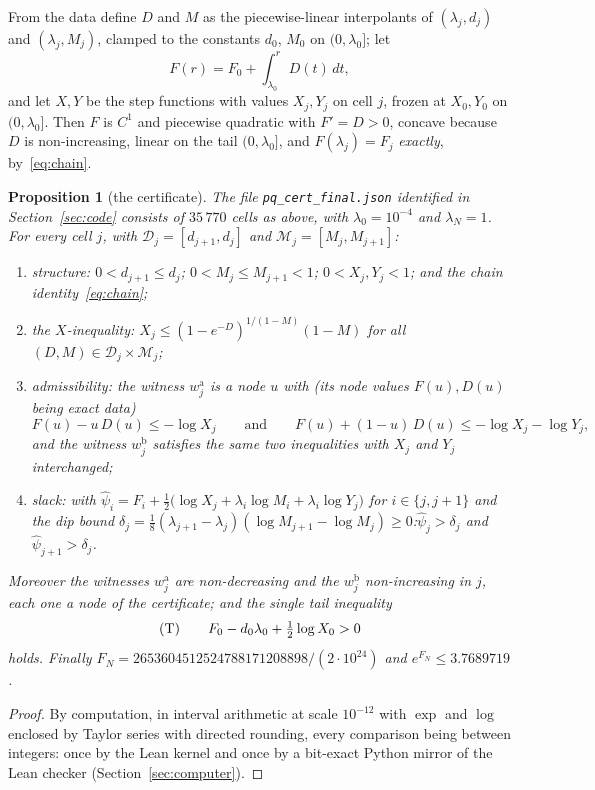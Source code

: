 \documentclass[11pt]{article}
\newtheorem{proposition}[theorem]{Proposition}
\theoremstyle{definition}
\newcommand{\lam}{\lambda}
\begin{document}
From the data define $D$ and $M$ as the piecewise-linear interpolants of $(\lam_j,d_j)$ and $(\lam_j,M_j)$, clamped to the constants $d_0$, $M_0$ on $(0,\lam_0]$; let
\[
F(r)=F_0+\int_{\lam_0}^{r}D(t)\,dt,
\]
and let $X,Y$ be the step functions with values $X_j,Y_j$ on cell $j$, frozen at $X_0,Y_0$ on $(0,\lam_0]$.  Then $F$ is $C^1$ and piecewise quadratic with $F'=D>0$, concave because $D$ is non-increasing, linear on the tail $(0,\lam_0]$, and $F(\lam_j)=F_j$ \emph{exactly}, by~\eqref{eq:chain}.

\begin{proposition}[the certificate]\label{prop:cert}
The file \texttt{pq\_cert\_final.json} identified in Section~\ref{sec:code} consists of $35\,770$ cells as above, with $\lam_0=10^{-4}$ and $\lam_N=1$.  For every cell $j$, with $\mathcal D_j=[d_{j+1},d_j]$ and $\mathcal M_j=[M_j,M_{j+1}]$:
\begin{enumerate}[leftmargin=2em]
\item[(C0)] \emph{structure}: $0<d_{j+1}\le d_j$; $0<M_j\le M_{j+1}<1$; $0<X_j,Y_j<1$; and the chain identity~\eqref{eq:chain};
\item[(C1)] \emph{the $X$-inequality}: $X_j\le(1-e^{-D})^{1/(1-M)}(1-M)$ for all $(D,M)\in\mathcal D_j\times\mathcal M_j$;
\item[(C2)] \emph{admissibility}: the witness $w^{\mathrm a}_j$ is a node $u$ with (its node values $F(u),D(u)$ being exact data)
\[
F(u)-u\,D(u)\le-\log X_j\qquad\text{and}\qquad F(u)+(1-u)\,D(u)\le-\log X_j-\log Y_j,
\]
and the witness $w^{\mathrm b}_j$ satisfies the same two inequalities with $X_j$ and $Y_j$ interchanged;
\item[(C3)] \emph{slack}: with $\hat\psi_i=F_i+\tfrac12\bigl(\log X_j+\lam_i\log M_i+\lam_i\log Y_j\bigr)$ for $i\in\{j,j+1\}$ and the dip bound $\delta_j=\tfrac18(\lam_{j+1}-\lam_j)(\log M_{j+1}-\log M_j)\ge0$:\quad $\hat\psi_j>\delta_j$ and $\hat\psi_{j+1}>\delta_j$.
\end{enumerate}
Moreover the witnesses $w^{\mathrm a}_j$ are non-decreasing and the $w^{\mathrm b}_j$ non-increasing in $j$, each one a node of the certificate; and the single tail inequality
\[
\textup{(T)}\qquad F_0-d_0\lam_0+\tfrac12\log X_0>0
\]
holds.  Finally $F_N=2653604512524788171208898/(2\cdot10^{24})$ and $e^{F_N}\le3.7689719$.
\end{proposition}

\begin{proof}
By computation, in interval arithmetic at scale $10^{-12}$ with $\exp$ and $\log$ enclosed by Taylor series with directed rounding, every comparison being between integers: once by the Lean kernel and once by a bit-exact Python mirror of the Lean checker (Section~\ref{sec:computer}).
\end{proof}
\end{document}
